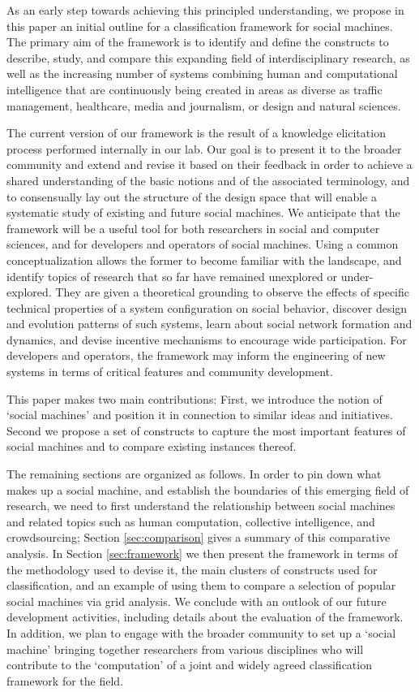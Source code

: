 \documentclass{sig-alternate}
\begin{document}
As an early step towards achieving this principled understanding, we propose in this paper an initial outline for a classification framework for social machines. The primary aim of the framework is to identify and define the constructs to describe, study, and compare this expanding field of interdisciplinary research, as well as the increasing number of systems combining human and computational intelligence that are continuously being created in areas as diverse as traffic management, healthcare, media and journalism, or design and natural sciences.

The current version of our framework is the result of a knowledge elicitation process performed internally in our lab. Our goal is to present it to the broader community and extend and revise it based on their feedback in order to achieve a shared understanding of the basic notions and of the associated terminology, and to consensually lay out the structure of the design space that will enable a systematic study of existing and future social machines. We anticipate that the framework will be a useful tool for both researchers in social and computer sciences, and for developers and operators of social machines. Using a common conceptualization allows the former to become familiar with the landscape, and identify topics of research that so far have remained unexplored or under-explored. They are given a theoretical grounding to observe the effects of specific technical properties of a system configuration on social behavior, discover design and evolution patterns of such systems, learn about social network formation and dynamics, and devise incentive mechanisms to encourage wide participation. For developers and operators, the framework may inform the engineering of new systems in terms of critical features and community development.

This paper makes two main contributions: First, we introduce the notion of `social machines' and position it in connection to similar ideas and initiatives. Second we propose a set of constructs to capture the most important features of social machines and to compare existing instances thereof.

The remaining sections are organized as follows. In order to pin down what makes up a social machine, and establish the boundaries of this emerging field of research, we need to first understand the relationship between social machines and related topics such as human computation, collective intelligence, and crowdsourcing; Section \ref{sec:comparison} gives a summary of this comparative analysis. In Section \ref{sec:framework} we then present the framework in terms of the methodology used to devise it, the main clusters of constructs used for classification, and an example of using them to compare a selection of popular social machines via grid analysis. We conclude with an outlook of our future development activities, including details about the evaluation of the framework. In addition, we plan to engage with the broader community to set up a `social machine' bringing together researchers from various disciplines who will contribute to the `computation' of a joint and widely agreed classification framework for the field.
\end{document}
